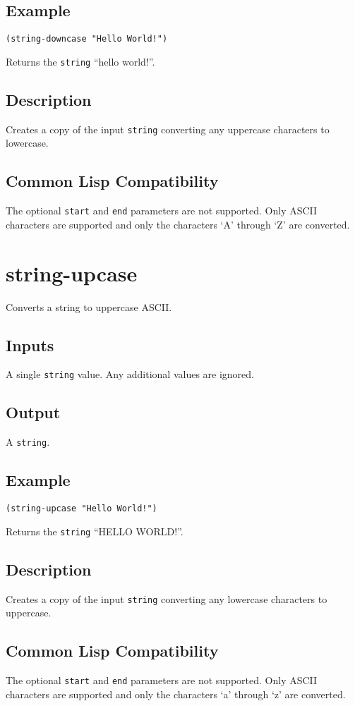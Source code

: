 \documentclass[10pt, openany]{book}
\newcommand{\keyword}[1]{\texttt{#1}}
\newcommand{\datatype}[1]{\texttt{#1}}
\begin{document}
\subsection{Example}
\begin{lstlisting}
(string-downcase "Hello World!")
\end{lstlisting}
Returns the \datatype{string} ``hello world!''.
\subsection{Description}
Creates a copy of the input \datatype{string} converting any uppercase characters to lowercase.
\subsection{Common Lisp Compatibility}
The optional \keyword{start} and \keyword{end} parameters are not supported.  Only ASCII characters are supported and only the characters `A' through `Z' are converted.

\section{string-upcase}
Converts a string to uppercase ASCII.
\subsection{Inputs}
A single \datatype{string} value.  Any additional values are ignored.
\subsection{Output}
A \datatype{string}.
\subsection{Example}
\begin{lstlisting}
(string-upcase "Hello World!")
\end{lstlisting}
Returns the \datatype{string} ``HELLO WORLD!''.
\subsection{Description}
Creates a copy of the input \datatype{string} converting any lowercase characters to uppercase.
\subsection{Common Lisp Compatibility}
The optional \keyword{start} and \keyword{end} parameters are not supported.  Only ASCII characters are supported and only the characters `a' through `z' are converted.
\end{document}
